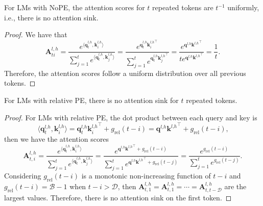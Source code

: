 \begin{proposition}\label{prop1}
    For LMs with NoPE, the attention scores for $t$ repeated tokens are $t^{-1}$ uniformly, i.e., there is no attention sink.
\end{proposition}
\begin{proof}
    We have that
    \begin{equation}
\boldsymbol{A}_{ti}^{l\textrm{,}\,h}=\frac{e^{\langle\boldsymbol{q}_t^{l\textrm{,}h}\textrm{,}\,\boldsymbol{k}_i^{l\textrm{,}h}\rangle}}{\sum_{j=1}^t e^{\langle\boldsymbol{q}_t^{l\textrm{,}h}\textrm{,}\,\boldsymbol{k}_j^{l\textrm{,}h}\rangle}}=\frac{e^{\boldsymbol{q}_t^{l\textrm{,}h}{\boldsymbol{k}_i^{l\textrm{,}h}}^\top}}{\sum_{j=1}^te^{\boldsymbol{q}_t^{l\textrm{,}h}{\boldsymbol{k}_j^{l\textrm{,}h}}^\top}}=\frac{e^{\boldsymbol{q}^{l\textrm{,}h}{\boldsymbol{k}^{l\textrm{,}h}}^\top}}{te^{\boldsymbol{q}^{l\textrm{,}h}{\boldsymbol{k}^{l\textrm{,}h}}^\top}}=\frac{1}{t}\textrm{.}
\end{equation}
Therefore, the attention scores follow a uniform distribution over all previous tokens.
\end{proof}


\begin{proposition}\label{prop2}
    For LMs with relative PE, there is no attention sink for $t$ repeated tokens.
\end{proposition}
\begin{proof}
    For LMs with relative PE, the dot product between each query and key is
\begin{equation}
\langle\boldsymbol{q}_t^{l\textrm{,}h}\textrm{,}\,\boldsymbol{k}_i^{l\textrm{,}h}\rangle=\boldsymbol{q}_t^{l\textrm{,}h}{\boldsymbol{k}_i^{l\textrm{,}h}}^\top + g_{\textrm{rel}}(t-i)=\boldsymbol{q}^{l\textrm{,}h}{\boldsymbol{k}^{l\textrm{,}h}}^\top + g_{\textrm{rel}}(t-i)\textrm{,}
\end{equation}
then we have the attention scores
\begin{equation}
\boldsymbol{A}_{t\textrm{,}\,i}^{l\textrm{,}\,h}=\frac{e^{\langle\boldsymbol{q}_t^{l\textrm{,}h}\textrm{,}\,\boldsymbol{k}_i^{l\textrm{,}h}\rangle}}{\sum_{j=1}^t e^{\langle\boldsymbol{q}_t^{l\textrm{,}h}\textrm{,}\,\boldsymbol{k}_j^{l\textrm{,}h}\rangle}}=\frac{e^{\boldsymbol{q}^{l\textrm{,}h}{\boldsymbol{k}^{l\textrm{,}h}}^\top+g_{\textrm{rel}}(t-i)}}{\sum_{j=1}^te^{\boldsymbol{q}^{l\textrm{,}h}{\boldsymbol{k}^{l\textrm{,}h}}^\top+g_{\textrm{rel}}(t-j)}}=\frac{e^{g_{\textrm{rel}}(t-i)}}{\sum_{j=1}^te^{g_{\textrm{rel}}(t-j)}}\textrm{.}
\end{equation}
Considering $g_{\textrm{rel}}(t-i)$ is a monotonic non-increasing function of $t-i$ and $g_{\textrm{rel}}(t-i)=\mathcal{B}-1$ when $t-i>\mathcal{D}$, then $\boldsymbol{A}_{t\textrm{,}\,1}^{l\textrm{,}\,h}=\boldsymbol{A}_{t\textrm{,}\,1}^{l\textrm{,}\,h}=\cdots=\boldsymbol{A}_{t\textrm{,}\,t-\mathcal{D}}^{l\textrm{,}\,h}$ are the largest values. Therefore, there is no attention sink on the first token.
\end{proof}


